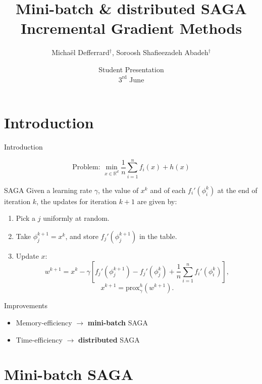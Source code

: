 \documentclass[11Pt,t,compress]{beamer}
\title[SAGA]{Mini-batch \& distributed SAGA\\
	\small{Incremental Gradient Methods}}
\author[Advanced Topics in Data Science (spring 2016)]{Michaël Defferrard$^\dagger$, Soroosh Shafieezadeh Abadeh$^\dagger$}
\institute{$^\dagger$ Ecole Polytechnique Federale de Lausanne}
\date{Student Presentation\\$3^{\text{rd}}$ June}
\begin{document}
\frame{\titlepage}

\newcommand{\R}{\mathbb{R}}
\newcommand{\B}{\mathcal{B}}
\newcommand{\prox}{\textrm{prox}}

\centering
\section{Introduction}

\begin{frame}{Introduction}

	\vspace{-0.8cm}
	$$\text{Problem: } \min_{x \in \R^d} \frac{1}{n} \sum_{i=1}^n f_i(x) +
	h(x)$$
	\vspace{-0.2cm}

	\begin{block}{SAGA}
	Given a learning rate $\gamma$, the value of $x^k$ and of each $f_i'
	(\phi_i^k)$ at the end of iteration $k$, the updates for iteration $k+1$ are
	given by:
	\begin{enumerate}
	\item Pick a $j$ uniformly at random.
	\item Take $\phi_j^{k+1} = x^k$, and store $f_j'(\phi_j^{k+1})$ in the table.
	\item Update $x$:
		\begin{equation*}
		w^{k+1} = x^k - \gamma \left[ f_j'(\phi_j^{k+1}) - f_j'(\phi_j^k)
		+ \frac1n \sum_{i=1}^n f_i'(\phi_i^k) \right] ,
		\end{equation*}
		$$x^{k+1} = \prox_\gamma^h (w^{k+1}).$$
	\end{enumerate}
	\end{block}

\end{frame}

\begin{frame}{Improvements}
	\vspace{2cm}
		\begin{itemize}
			\item Memory-efficiency $\rightarrow$ \textbf{mini-batch} SAGA
			\item Time-efficiency $\rightarrow$ \textbf{distributed} SAGA
		\end{itemize}
\end{frame}

\section{Mini-batch SAGA}
\end{document}
